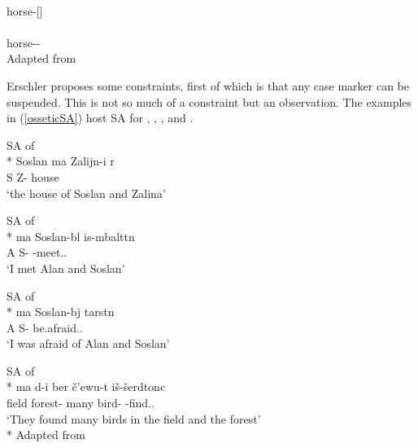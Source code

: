 \begin{exe}
    \ex \label{osseticdeletion}
    \begin{xlist}
        \ex {} \\ horse-{\Pl}[{\Nom}] \\
        
        \ex {} \\ horse-{\Pl}-{\Obl} \\
        \glt \hfill Adapted from \cite{erschler2012suspended}
    \end{xlist}
\end{exe}

Erschler proposes some constraints, first of which is that any case marker can be suspended. This is not so much of a constraint but an observation. The examples in (\ref{osseticSA}) host SA for {\Obl}, {\Sup}, {\Abl}, and {\Loc}.

\begin{exe}
    \ex \label{osseticSA}
    \begin{xlist}
        \ex SA of {\Obl}\\* 
        \gll Soslan {\textturna ma} {Zalijn-i} {\textchi\textturna\textdzlig r\textturna} \\ 
        S {\And} Z-{\Obl} house \\
        \glt `the house of Soslan and Zalina'
        
        \ex SA of {\Sup}\\*
         {\textturna ma} {Soslan-b\textturna l} {is-\textturna mbaltt\textturna n} \\ 
        A {\And} S-{\Sup} {\Prv}-meet.{\Pst}.{\Fsg} \\
        \glt `I met Alan and Soslan'
        
        \ex SA of {\Abl}\\*
         {\textturna ma} {Soslan-b\textturna j} {tarst\textturna n} \\ 
        A {\And} S-{\Abl} be.afraid.{\Pst}.{\Fsg} \\
        \glt `I was afraid of Alan and Soslan'
        
        \ex SA of {\Loc}\\*
         {\textturna ma} {\textinvscr\textturna d-i} {ber\textturna} {\v{c}'ewu-t\textturna} {i\v{s}-\v{s}erdtonc\textturna} \\ 
        field {\And} forest-{\Loc} many bird-{\Pl} {\Prv}-find.{\Pst}.{\Tpl} \\
        \glt `They found many birds in the field and the forest'\\*
        \hfill Adapted from \cite{erschler2012suspended}
    \end{xlist}
\end{exe}

